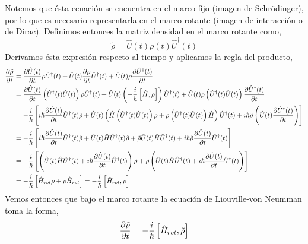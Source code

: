 Notemos que ésta ecuación se encuentra en el marco fijo (imagen de Schrödinger), por lo que es necesario representarla en el marco rotante (imagen de interacción o de Dirac). Definimos entonces la matriz densidad en el marco rotante como,
\begin{equation}
    \tilde{\rho} = \hat{U}(t) \rho(t) \hat{U}^{\dagger}(t)
\end{equation}
Derivamos ésta expresión respecto al tiempo y aplicamos la regla del producto,
\begin{equation*}
\begin{split}
    \pdv{\tilde{\rho}}{t} &= \pdv{\hat{U}(t)}{t} \rho \hat{U}^{\dagger}(t) + \hat{U}(t)\pdv{\rho}{t} \hat{U}^{\dagger}(t) + \hat{U}(t) \rho \pdv{\hat{U}^{\dagger}(t)}{t} \\
    &= \pdv{\hat{U}(t)}{t} \left(\hat{U}^{\dagger}(t) \hat{U}(t)\right) \rho \hat{U}^{\dagger}(t) + \hat{U}(t)\left(-\frac{i}{\hbar} \left[\hat{H}, \rho \right] \right) \hat{U}^{\dagger}(t) + \hat{U}(t) \rho \left(\hat{U}^{\dagger}(t) \hat{U}(t)\right) \pdv{\hat{U}^{\dagger}(t)}{t} \\
    &= - \frac{i}{\hbar}\left[i \hbar \pdv{\hat{U}(t)}{t} \hat{U}^{\dagger}(t) \tilde{\rho} + \hat{U}(t)\left(\hat{H} \left(\hat{U}^{\dagger}(t) \hat{U}(t)\right)  \rho + \rho \left(\hat{U}^{\dagger}(t) \hat{U}(t)\right)  \hat{H} \right) \hat{U}^{\dagger}(t)+ i \hbar \tilde{\rho} \left( \hat{U}(t) \pdv{\hat{U}^{\dagger}(t)}{t}\right) \right] \\
    &= - \frac{i}{\hbar}\left[i \hbar \pdv{\hat{U}(t)}{t} \hat{U}^{\dagger}(t) \tilde{\rho} + \hat{U}(t)\hat{H}\hat{U}^{\dagger}(t) \tilde{\rho} + \tilde{\rho} \hat{U}(t) \hat{H} \hat{U}^{\dagger}(t)+ i \hbar \tilde{\rho} \pdv{\hat{U}(t)}{t} \hat{U}^{\dagger}(t)  \right] \\
    &= - \frac{i}{\hbar}\left[ \left(\hat{U}(t)\hat{H}\hat{U}^{\dagger}(t) + i \hbar \pdv{\hat{U}(t)}{t} \hat{U}^{\dagger}(t) \right) \tilde{\rho} + \tilde{\rho} \left(\hat{U}(t) \hat{H} \hat{U}^{\dagger}(t)+ i \hbar \pdv{\hat{U}(t)}{t} \hat{U}^{\dagger}(t) \right) \right] \\
    &= - \frac{i}{\hbar}\left[ \hat{H}_{rot} \tilde{\rho} + \tilde{\rho} \hat{H}_{rot} \right] = - \frac{i}{\hbar}\left[\hat{H}_{rot}, \tilde{\rho}\right]
\end{split}
\end{equation*}
Vemos entonces que bajo el marco rotante la ecuación de Liouville-von Neumman toma la forma,
\begin{equation}
    \pdv{\tilde{\rho}}{t} = - \frac{i}{\hbar}\left[\hat{H}_{rot}, \tilde{\rho}\right]
\label{eq:neumann}
\end{equation}

